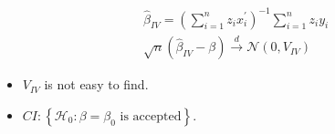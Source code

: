 \begin{eg}
\begin{enumerate}
    \end{enumerate}

    \begin{align*}
        & \hat{\beta}_{IV} = \left( \sum_{i=1}^{n} z_i x_i^{\prime} \right)^{-1} \sum_{i=1}^{n} z_i y_i \\
        & \sqrt{n}(\hat{\beta}_{IV} - \beta) \xrightarrow{d} \mathcal{N}(0, V_{IV})
    \end{align*}

    \begin{itemize}
        \item $V_{IV}$ is not easy to find.
        \item $CI: \left\{ \mathcal{H}_0: \beta = \beta_0 \text{ is accepted} \right\}$.
    \end{itemize}
\end{eg}
